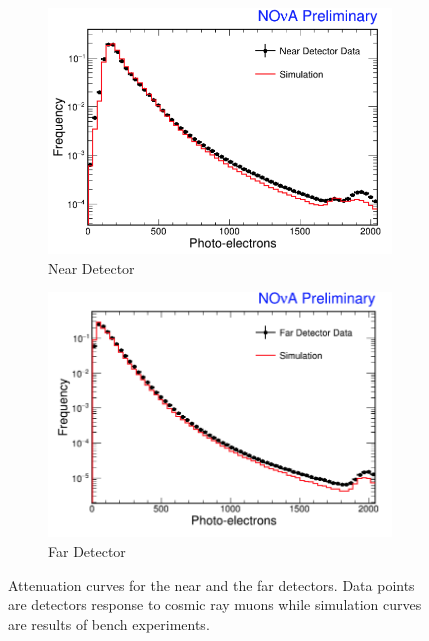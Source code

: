 \begin{figure}[t!]
\begin{subfigure}[t]{0.9\textwidth}
  \centering
  \includegraphics[width=0.9\linewidth]{figures/AttenuationND.png}
  \caption{Near Detector}
  \label{fig:attND}
\end{subfigure}
\vspace{0.5cm}
\newline
\begin{subfigure}[t]{0.9\textwidth}
  \centering
  \includegraphics[width=0.9\linewidth]{figures/AttenuationFD.png}
  \caption{Far Detector}
  \label{fig:attFD}
\end{subfigure}
\caption{Attenuation curves for the near and the far detectors. Data points are detectors response to cosmic ray
	muons while simulation curves are results of bench experiments.}
\label{fig:att}
\end{figure}

